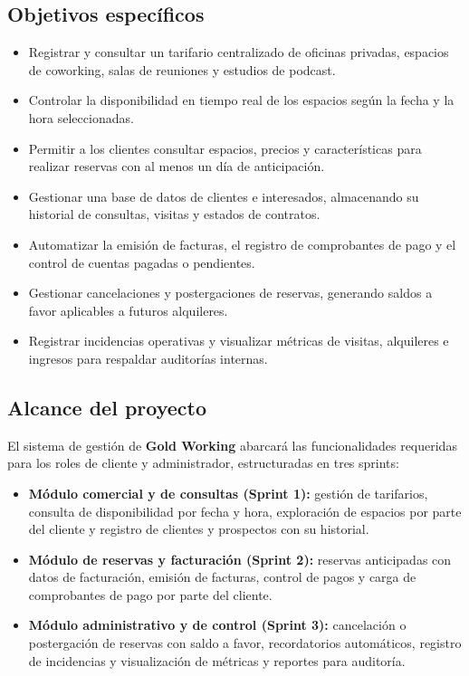 \documentclass[12pt,a4paper]{article}
\begin{document}
\subsection{Objetivos espec\'ificos}
\begin{itemize}
  \item Registrar y consultar un tarifario centralizado de oficinas privadas, espacios de coworking, salas de reuniones y estudios de podcast.
  \item Controlar la disponibilidad en tiempo real de los espacios seg\'un la fecha y la hora seleccionadas.
  \item Permitir a los clientes consultar espacios, precios y caracter\'isticas para realizar reservas con al menos un d\'ia de anticipaci\'on.
  \item Gestionar una base de datos de clientes e interesados, almacenando su historial de consultas, visitas y estados de contratos.
  \item Automatizar la emisi\'on de facturas, el registro de comprobantes de pago y el control de cuentas pagadas o pendientes.
  \item Gestionar cancelaciones y postergaciones de reservas, generando saldos a favor aplicables a futuros alquileres.
  \item Registrar incidencias operativas y visualizar m\'etricas de visitas, alquileres e ingresos para respaldar auditor\'ias internas.
\end{itemize}

\subsection{Alcance del proyecto}
El sistema de gesti\'on de \textbf{Gold Working} abarcar\'a las funcionalidades requeridas para los roles de cliente y administrador, estructuradas en tres sprints:
\begin{itemize}
  \item \textbf{M\'odulo comercial y de consultas (Sprint 1):} gesti\'on de tarifarios, consulta de disponibilidad por fecha y hora, exploraci\'on de espacios por parte del cliente y registro de clientes y prospectos con su historial.
  \item \textbf{M\'odulo de reservas y facturaci\'on (Sprint 2):} reservas anticipadas con datos de facturaci\'on, emisi\'on de facturas, control de pagos y carga de comprobantes de pago por parte del cliente.
  \item \textbf{M\'odulo administrativo y de control (Sprint 3):} cancelaci\'on o postergaci\'on de reservas con saldo a favor, recordatorios autom\'aticos, registro de incidencias y visualizaci\'on de m\'etricas y reportes para auditor\'ia.
\end{itemize}
\end{document}
